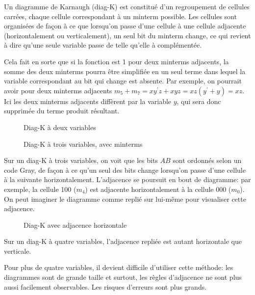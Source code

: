 \documentclass[11pt]{article}
\begin{document}
Un diagramme de Karnaugh (diag-K) est constitué d'un regroupement de
cellules carrées, chaque cellule correspondant à un minterm
possible. Les cellules sont organisées de façon à ce que lorsqu'on
passe d'une cellule à une cellule adjacente (horizontalement ou
verticalement), un seul bit du minterm change, ce qui revient à dire
qu'une seule variable passe de telle qu'elle à complémentée.

Cela fait en sorte que si la fonction est 1 pour deux minterms
adjacents, la somme des deux minterms pourra être simplifiée en un
seul terme dans lequel la variable correspondant au bit qui change est
absente. Par exemple, on pourrait avoir pour deux minterms adjacents
\(m_5 + m_7 = xy^\prime z + xyz = xz(y^\prime + y) = xz\). Ici les
deux minterms adjacents diffèrent par la variable \(y\), qui sera donc
supprimée du terme produit résultant.

\begin{figure}[htbp]
\centering

\caption{\label{fig:orgbb99bb6}Diag-K à deux variables}
\end{figure}

\begin{figure}[htbp]
\centering

\caption{\label{fig:orged5261d}Diag-K à trois variables, avec minterms}
\end{figure}

Sur un diag-K à trois variables, on voit que les bits \(AB\) sont
ordonnés selon un code Gray, de façon à ce qu'un seul des bits change
lorsqu'on passe d'une cellule à la suivante
horizontalement. L'adjacence se poursuit en bout de diagramme: par
exemple, la cellule 100 (\(m_4\)) est adjacente horizontalement à la
cellule 000 (\(m_0\)). On peut imaginer le diagramme comme replié sur
lui-même pour visualiser cette adjacence.

\begin{figure}[htbp]
\centering

\caption{\label{fig:org6535bdc}Diag-K avec adjacence horizontale}
\end{figure}

Sur un diag-K à quatre variables, l'adjacence repliée est autant horizontale
que verticale.

Pour plus de quatre variables, il devient difficile d'utiliser cette
méthode: les diagrammes sont de grande taille et surtout, les règles
d'adjacence ne sont plus aussi facilement observables. Les risques
d'erreurs sont plus grands.
\end{document}
